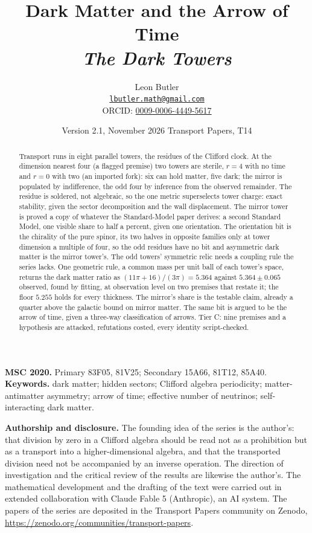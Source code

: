 \documentclass[11pt]{article}
\title{\bfseries Dark Matter and the Arrow of Time\\[4pt]
  \large\itshape The Dark Towers}
\author{Leon Butler\\ \normalsize\href{mailto:lbutler.math@gmail.com}{\texttt{lbutler.math@gmail.com}}\\ \normalsize ORCID: \href{https://orcid.org/0009-0006-4449-5617}{0009-0006-4449-5617}}
\date{Version 2.1, November 2026 \textperiodcentered{} Transport Papers, T14}
\theoremstyle{definition}
\begin{document}
\maketitle

\begin{abstract}
\normalsize
Transport runs in eight parallel towers, the residues of the Clifford clock. At the dimension nearest four (a flagged premise) two towers are sterile, $r = 4$ with no time and $r = 0$ with two (an imported fork): six can hold matter, five dark; the mirror is populated by indifference, the odd four by inference from the observed remainder. The residue is soldered, not algebraic, so the one metric superselects tower charge: exact stability, given the sector decomposition and the wall displacement. The mirror tower is proved a copy of whatever the Standard-Model paper derives: a second Standard Model, one visible share to half a percent, given one orientation. The orientation bit is the chirality of the pure spinor, its two halves in opposite families only at tower dimension a multiple of four, so the odd residues have no bit and asymmetric dark matter is the mirror tower's. The odd towers' symmetric relic needs a coupling rule the series lacks. One geometric rule, a common mass per unit ball of each tower's space, returns the dark matter ratio as $(11\pi + 16)/(3\pi) = 5.364$ against $5.364 \pm 0.065$ observed, found by fitting, at observation level on two premises that restate it; the floor $5.255$ holds for every thickness. The mirror's share is the testable claim, already a quarter above the galactic bound on mirror matter. The same bit is argued to be the arrow of time, given a three-way classification of arrows. Tier C: nine premises and a hypothesis are attacked, refutations costed, every identity script-checked.
\end{abstract}

\medskip
\noindent\textbf{MSC 2020.} Primary 83F05, 81V25; Secondary 15A66, 81T12, 85A40.\\
\textbf{Keywords.} dark matter; hidden sectors; Clifford algebra periodicity; matter-antimatter asymmetry; arrow of time; effective number of neutrinos; self-interacting dark matter.

\newpage
\textbf{Authorship and disclosure. }The founding idea of the series is the author's: that division by zero in a Clifford algebra should be read not as a prohibition but as a transport into a higher-dimensional algebra, and that the transported division need not be accompanied by an inverse operation. The direction of investigation and the critical review of the results are likewise the author's. The mathematical development and the drafting of the text were carried out in extended collaboration with Claude Fable 5 (Anthropic), an AI system. The papers of the series are deposited in the Transport Papers community on Zenodo, \url{https://zenodo.org/communities/transport-papers}.
\end{document}
